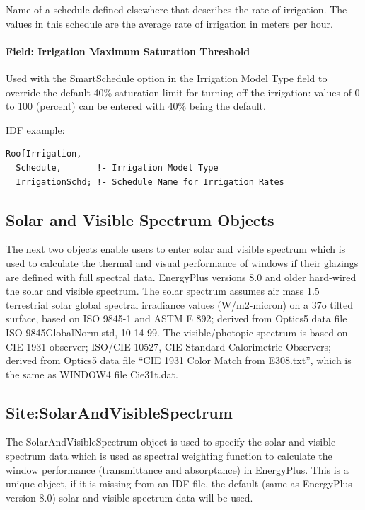 Name of a schedule defined elsewhere that describes the rate of irrigation. The values in this schedule are the average rate of irrigation in meters per hour.

\paragraph{Field: Irrigation Maximum Saturation Threshold}\label{field-irrigation-maximum-saturation-threshold}

Used with the SmartSchedule option in the Irrigation Model Type field to override the default 40\% saturation limit for turning off the irrigation: values of 0 to 100 (percent) can be entered with 40\% being the default.

IDF example:

\begin{lstlisting}
RoofIrrigation,
  Schedule,       !- Irrigation Model Type
  IrrigationSchd; !- Schedule Name for Irrigation Rates
\end{lstlisting}

\subsection{Solar and Visible Spectrum Objects}\label{solar-and-visible-spectrum-objects}

The next two objects enable users to enter solar and visible spectrum which is used to calculate the thermal and visual performance of windows if their glazings are defined with full spectral data. EnergyPlus versions 8.0 and older hard-wired the solar and visible spectrum. The solar spectrum assumes air mass 1.5 terrestrial solar global spectral irradiance values (W/m2-micron) on a 37o tilted surface, based on ISO 9845-1 and ASTM E 892; derived from Optics5 data file ISO-9845GlobalNorm.std, 10-14-99. The visible/photopic spectrum is based on CIE 1931 observer; ISO/CIE 10527, CIE Standard Calorimetric Observers; derived from Optics5 data file ``CIE 1931 Color Match from E308.txt'', which is the same as WINDOW4 file Cie31t.dat.

\subsection{Site:SolarAndVisibleSpectrum}\label{sitesolarandvisiblespectrum}

The SolarAndVisibleSpectrum object is used to specify the solar and visible spectrum data which is used as spectral weighting function to calculate the window performance (transmittance and absorptance) in EnergyPlus. This is a unique object, if it is missing from an IDF file, the default (same as EnergyPlus version 8.0) solar and visible spectrum data will be used.

